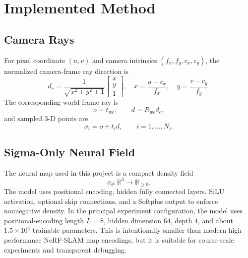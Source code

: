 \documentclass[conference]{IEEEtran}
\newcommand{\R}{\mathbb{R}}
\begin{document}
\section{Implemented Method}
\subsection{Camera Rays}
For pixel coordinate $(u,v)$ and camera intrinsics $(f_x,f_y,c_x,c_y)$, the normalized camera-frame ray direction is
\begin{equation}
d_c=\frac{1}{\sqrt{x^2+y^2+1}}\begin{bmatrix}x\\y\\1\end{bmatrix},\quad x=\frac{u-c_x}{f_x},\quad y=\frac{v-c_y}{f_y}.
\label{eq:ray-camera}
\end{equation}
The corresponding world-frame ray is
\begin{equation}
o=t_{wc},\qquad d=R_{wc}d_c,
\end{equation}
and sampled 3-D points are
\begin{equation}
x_i=o+t_i d,\qquad i=1,\ldots,N_s.
\end{equation}

\subsection{Sigma-Only Neural Field}
The neural map used in this project is a compact density field
\begin{equation}
\sigma_\theta:\R^3\rightarrow\R_{\geq 0}.
\end{equation}
The model uses positional encoding, hidden fully connected layers, SiLU activation, optional skip connections, and a Softplus output to enforce nonnegative density. In the principal experiment configuration, the model uses positional-encoding length $L=8$, hidden dimension $64$, depth $4$, and about $1.5\times 10^4$ trainable parameters. This is intentionally smaller than modern high-performance NeRF-SLAM map encodings, but it is suitable for course-scale experiments and transparent debugging.
\end{document}
